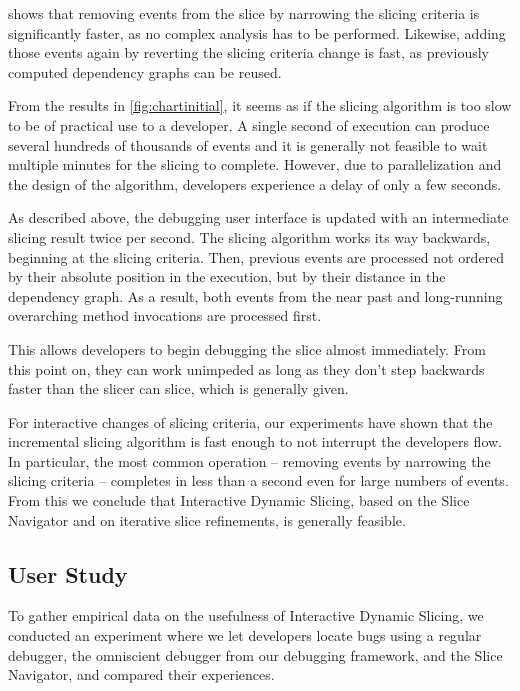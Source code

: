 \documentclass[
			english,
			review,
			]{elsarticle}
\begin{document}
 shows that removing events from the slice by narrowing the slicing criteria is significantly faster, as no complex analysis has to be performed.
Likewise, adding those events again by reverting the slicing criteria change is fast, as previously computed dependency graphs can be reused.

\medskip

From the results in \cref{fig:chartinitial}, it seems as if the slicing algorithm is too slow to be of practical use to a developer.
A single second of execution can produce several hundreds of thousands of events and it is generally not feasible to wait multiple minutes for the slicing to complete.
However, due to parallelization and the design of the algorithm, developers experience a delay of only a few seconds.

As described above, the debugging user interface is updated with an intermediate slicing result twice per second.
The slicing algorithm works its way backwards, beginning at the slicing criteria.
Then, previous events are processed not ordered by their absolute position in the execution, but by their distance in the dependency graph.
As a result, both events from the near past and long-running overarching method invocations are processed first.

This allows developers to begin debugging the slice almost immediately. 
From this point on, they can work unimpeded as long as they don't step backwards faster than the slicer can slice, which is generally given.

For interactive changes of slicing criteria, our experiments have shown that the incremental slicing algorithm is fast enough to not interrupt the developers flow.
In particular, the most common operation -- removing events by narrowing the slicing criteria -- completes in less than a second even for large numbers of events.
From this we conclude that Interactive Dynamic Slicing, based on the Slice Navigator and on iterative slice refinements, is generally feasible.

\subsection{User Study}

To gather empirical data on the usefulness of Interactive Dynamic Slicing, we conducted an experiment where we let developers locate bugs using a regular debugger, the omniscient debugger from our debugging framework, and the Slice Navigator, and compared their experiences.
\end{document}
